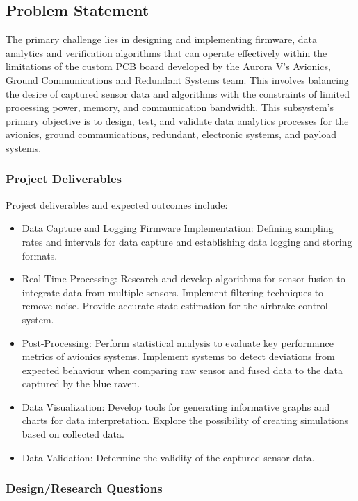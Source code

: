 \subsection{Problem Statement}
The primary challenge lies in designing and implementing firmware, data analytics and verification algorithms that can operate effectively within the limitations of the custom PCB board developed by the Aurora V's Avionics, Ground Communications and Redundant Systems team. This involves balancing the desire of captured sensor data and algorithms with the constraints of limited processing power, memory, and communication bandwidth. This subsystem’s primary objective is to design, test, and validate data analytics processes for the avionics, ground communications, redundant, electronic systems, and payload systems. 

\subsubsection{Project Deliverables}
Project deliverables and expected outcomes include:  
\begin{itemize}
  \item Data Capture and Logging Firmware Implementation: Defining sampling rates and intervals for data capture and establishing data logging and storing formats. 
  \item Real-Time Processing: Research and develop algorithms for sensor fusion to integrate data from multiple sensors. Implement filtering techniques to remove noise. Provide accurate state estimation for the airbrake control system. 
  \item Post-Processing: Perform statistical analysis to evaluate key performance metrics of avionics systems. Implement systems to detect deviations from expected behaviour when comparing raw sensor and fused data to the data captured by the blue raven. 
  \item Data Visualization: Develop tools for generating informative graphs and charts for data interpretation. Explore the possibility of creating simulations based on collected data. 
  \item Data Validation: Determine the validity of the captured sensor data.  
\end{itemize}

\subsubsection{Design/Research Questions}
